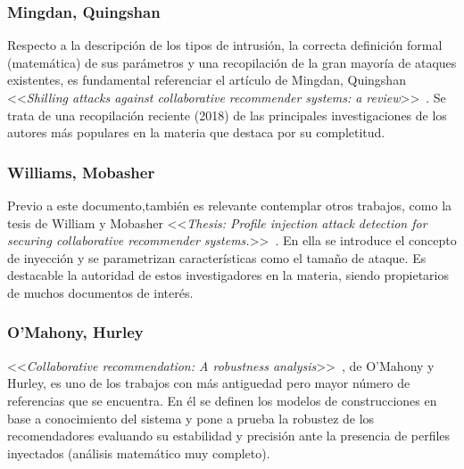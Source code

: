 \subsubsection{Mingdan, Quingshan~\cite{mingdan2018ShillingAttacksAReview}}
Respecto a la descripción de los tipos de intrusión, la correcta definición formal (matemática) de sus parámetros y una recopilación de la gran mayoría de ataques existentes, es fundamental referenciar el artículo de Mingdan, Quingshan <<\textit{Shilling attacks against collaborative recommender systems: a review}>>~\cite{mingdan2018ShillingAttacksAReview}. Se trata de una recopilación reciente (2018) de las principales investigaciones de los autores más populares en la materia que destaca por su completitud.

\subsubsection{Williams, Mobasher~\cite{Mobasher2006Thesis}}
Previo a este documento,también es relevante contemplar otros trabajos, como la tesis de William y Mobasher <<\textit{Thesis: Profile injection attack detection for securing collaborative recommender systems.}>>~\cite{Mobasher2006Thesis}. En ella se introduce el concepto de inyección y se parametrizan características como el tamaño de ataque. Es destacable la autoridad de estos investigadores en la materia, siendo propietarios de muchos documentos de interés.

\subsubsection{O'Mahony, Hurley~\cite{mahony2004CollaborativeRecommendation}}
<<\textit{Collaborative recommendation: A robustness analysis}>>~\cite{mahony2004CollaborativeRecommendation}, de O'Mahony y Hurley, es uno de los trabajos con más antiguedad pero mayor número de referencias que se encuentra. En él se definen los modelos de construcciones en base a conocimiento del sistema y pone a prueba la robustez de los recomendadores evaluando su estabilidad y precisión ante la presencia de perfiles inyectados (análisis matemático muy completo).